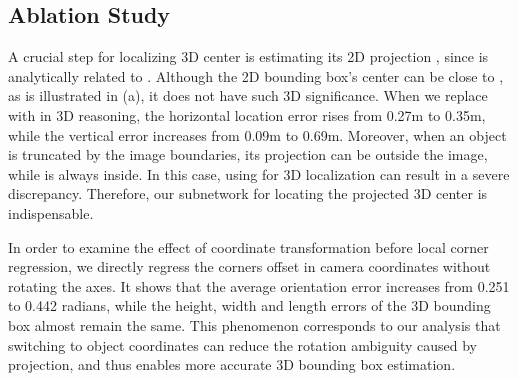 \begin{table}[]
\caption{{3D Bounding Box Parameters Error.}} 
\label{tab:3dparams}
\end{table}




\subsection{Ablation Study}
A crucial step for localizing 3D center  is estimating its 2D projection , since  is analytically related to . Although the 2D bounding box's center  can be close to , as is illustrated in \fig{\ref{fig:notation}} (a), it does not have such 3D significance. When we replace  with  in 3D reasoning, the horizontal location error rises from 0.27m to 0.35m, while the vertical error increases from 0.09m to 0.69m. Moreover, when an object is truncated by the image boundaries, its projection  can be outside the image, while  is always inside. In this case, using  for 3D localization can result in a severe discrepancy. Therefore, our subnetwork for locating the projected 3D center is indispensable.



In order to examine the effect of coordinate transformation before local corner regression, we directly regress the corners offset in camera coordinates without rotating the axes. It shows that the average orientation error increases from 0.251 to 0.442 radians, while the height, width and length errors of the 3D bounding box almost remain the same. This phenomenon corresponds to our analysis that switching to object coordinates can reduce the rotation ambiguity caused by projection, and thus enables more accurate 3D bounding box estimation.

